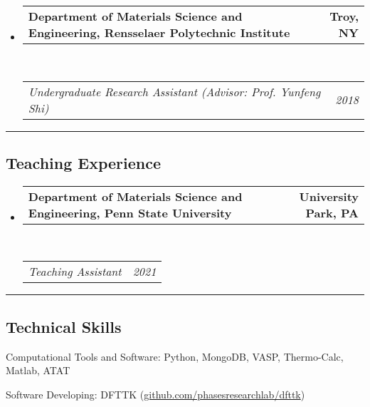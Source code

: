 \documentclass[10pt,letterpaper]{article}
\makeatletter
\newenvironment{indentsection}[1]%
{\begin{list}{}%
  {\setlength{\leftmargin}{#1}}%
  \item[]%
}
{\end{list}}
\newcommand{\headerrow}[2]
{\begin{tabular*}{\linewidth}{l@{\extracolsep{\fill}}r}
  #1 &
  #2 \\
\end{tabular*}}
\makeatother
\begin{document}
\begin{itemize}
  \item
  \headerrow
    {\textbf{Department of Materials Science and Engineering, Rensselaer Polytechnic Institute}}
    {\textbf{Troy, NY}}
  \\
  \headerrow
    {\emph{Undergraduate Research Assistant (Advisor: Prof. Yunfeng Shi)}}
    {\emph{2018}}

\end{itemize}

\hrule
\vspace{-0.6em}
\subsection*{Teaching Experience}

\renewcommand\labelitemiii{$\circ$}
\begin{itemize}
    \parskip=0.1em

    \item
    \headerrow
    {\textbf{Department of Materials Science and Engineering, Penn State University}}
    {\textbf{University Park, PA}}
    \\
    \headerrow
    {\emph{Teaching Assistant}}
    {\emph{2021}}
\end{itemize}



\hrule
\vspace{-0.6em}
\subsection*{Technical Skills}

\begin{indentsection}{\parindent}
\begin{description*}
  \item[Computational Tools and Software:]
  Python, MongoDB, VASP, Thermo-Calc, Matlab, ATAT
  \item [Software Developing:]
  DFTTK (\href{https://github.com/PhasesResearchLab/DFTTK}{github.com/phasesresearchlab/dfttk})
\end{description*}
\end{indentsection}
\end{document}
